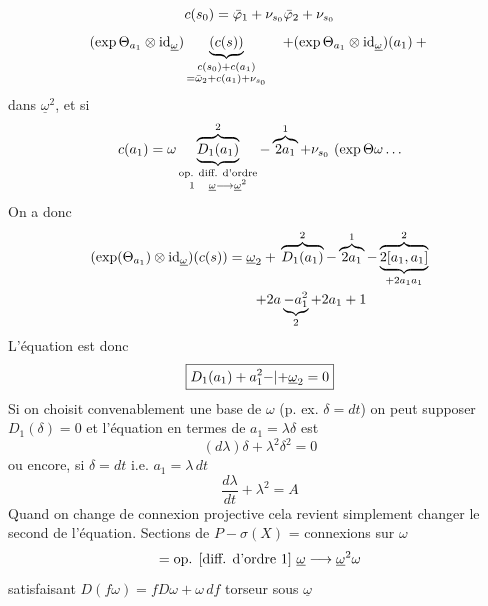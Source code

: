 \[
c(s_0)={{\bar\varphi_1+\nu_{s_0}}}\bar\varphi_2+\nu_{s_0}
\]
\[
(\exp\Theta_{a_1}\otimes\mathrm{id}_{\underline\omega})
\underbrace{(c(s))}_{\substack{c(s_0)+c(a_1)\\=\bar\omega_2+c(a_1)+\nu_{s_0}}}
\quad{{+}}(\exp\Theta_{a_1}\otimes\mathrm{id}_{\underline\omega})({a_1})+{}
\]
 dans $\underline\omega^2$, et si
\[
c(a_1)=\deleted{\unsure{\omega}}\underbrace{\overbrace{D_1(a_1)}^{2}}_{\substack{\text{op. diff. d'ordre}\\1\quad\underline\omega\longrightarrow\underline\omega^2}}
-\overbrace{2a_1}^{1}+\deleted{\unsure{\nu_{s_0}}}\ (\deleted{\unsure{\exp\Theta\omega}}\ldots
\]
On a donc
\[
\begin{aligned}
(\exp(\Theta_{a_1})\otimes\mathrm{id}_{\underline\omega})(c(s))
&={\underline\omega_2+{}}\overbrace{D_1(a_1)}^{2}-\overbrace{2a_1}^{1}
-\underbrace{\overbrace{2[a_1,a_1]}^{2}}_{+2a_1a_1}\\
&\qquad{+2{a}}\underbrace{-a_1^2}_{2}+2a_1+1
\end{aligned}
\]
L'équation est donc
\[
\boxed{D_1(a_1)+a_1^2{-|+}\underline\omega_2=0}
\]
Si on choisit convenablement une base de $\omega$ (p. ex. $\delta=dt$) on peut supposer $D_1(\delta)=0$ et l'équation en termes de $a_1=\lambda\delta$ est
\[
(d\lambda)\delta+\lambda^2\delta^2=0
\]
ou encore, si $\delta=dt$ i.e. $a_1=\lambda\,dt$
\[
\boxed{\frac{d\lambda}{dt}+\lambda^2=A}
\]
Quand on change de connexion projective cela revient simplement  changer le second  de l'équation.
Sections de $P-\sigma(X)$ = connexions sur $\omega$
\[
=\text{op. [diff. d'ordre 1] }\underline\omega\longrightarrow\underline\omega^{{2}}{{\omega}}
\]
satisfaisant $D(f\omega)=fD\omega+\omega\,df$
 torseur sous $\underline\omega$

